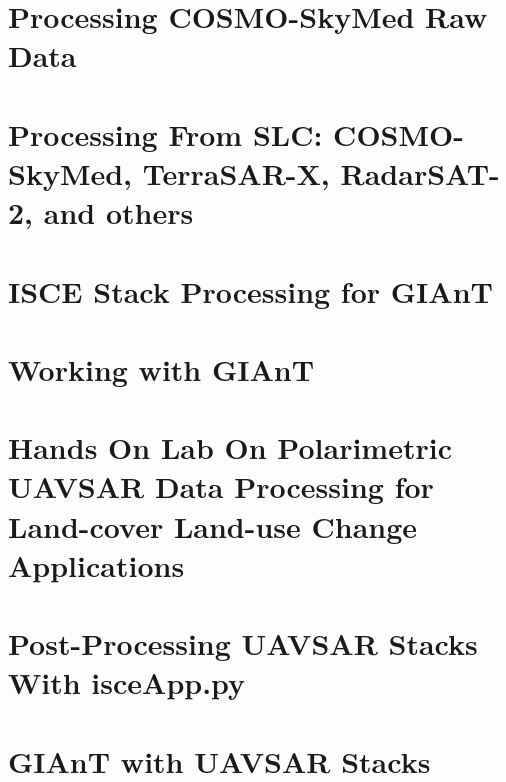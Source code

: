 \documentclass[11pt]{book}
\begin{document}
\chapter{Processing COSMO-SkyMed Raw Data}


\chapter{Processing From SLC: COSMO-SkyMed, TerraSAR-X, RadarSAT-2, and others}


\chapter{ISCE Stack Processing for GIAnT}


\chapter{Working with GIAnT}



\chapter{Hands On Lab On Polarimetric UAVSAR Data Processing for Land-cover Land-use Change Applications}


\chapter{Post-Processing UAVSAR Stacks With isceApp.py}


\chapter{GIAnT with UAVSAR Stacks}




\clearpage

%
%
%
\end{document}
